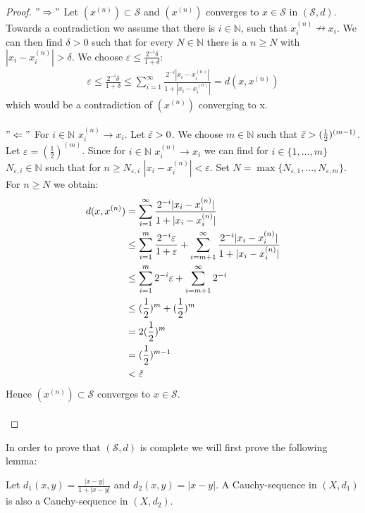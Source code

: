 \documentclass[a4paper]{article}
\newcommand{\N}{\mathbb{N}} %
\begin{document}
\begin{proof}
$"\Rightarrow"$ Let $(x^{(n)}) \subset \mathcal{S}$ and $(x^{(n)})$ converges to $x \in \mathcal{S}$ in $(\mathcal{S},d)$.
Towards a contradiction we assume that there is $i \in \N$, such that $x_i^{(n)} \nrightarrow x_i$. We can then find $\delta > 0$ such that for every $N \in \N$ there is a $n \geq N$ with $|x_i - x_i^{(n)}|> \delta$. We choose $\varepsilon \leq \frac{2^{-i} \delta}{1+ \delta}$:
\begin{align*}
    \varepsilon \leq \frac{2^{-i} \delta}{1+ \delta} \leq \sum_{i = 1}^{\infty} \frac{2^{-i} |x_i -  x_i^{(n)}|}{1+ |x_i -  x_i^{(n)}|} = d(x, x^{(n)})
\end{align*}
which would be a contradiction of $(x^{(n)})$ converging to x.\\\\
$"\Leftarrow"$ For $i \in \N$ $x_i^{(n)} \to x_i$. Let $\Tilde{\varepsilon} > 0 $. We choose $m \in \N$ such that $\Tilde{\varepsilon} > (\frac{1}{2})^{(m-1)}$. Let $\varepsilon = (\frac{1}{2})^{(m)}$. Since for $i \in \N$ $x_i^{(n)} \to x_i$ we can find for $i \in \{1,...,m\}$ $N_{\varepsilon,i} \in \N$ such that for $n \geq N_{\varepsilon,i}$ $|x_i- x_i^{(n)}|  < \varepsilon$. Set $N = \max\{N_{\varepsilon,1},...,N_{\varepsilon,m} \}$. For $n \geq N$ we obtain: 
\begin{align*}
    d(x, x^{(n)}) & = \sum_{i = 1}^{\infty} \frac{2^{-i} |x_i -  x_i^{(n)}|}{1+ |x_i -  x_i^{(n)}|}\\
    & \leq \sum_{i = 1}^{m} \frac{2^{-i} \varepsilon}{ 1+ \varepsilon } + \sum_{i = m+1}^{\infty} \frac{2^{-i} |x_i -  x_i^{(n)}|}{1+ |x_i -  x_i^{(n)}|}\\
    & \leq \sum_{i = 1}^{m} 2^{-i} \varepsilon + \sum_{i = m+1}^{\infty} 2^{-i} \\
    & \leq (\frac{1}{2})^m + (\frac{1}{2})^m \\
    & = 2 (\frac{1}{2})^m \\
    & = (\frac{1}{2})^{m-1} \\
    & < \Tilde{\varepsilon}
\end{align*}
Hence $(x^{(n)}) \subset \mathcal{S}$ converges to $x \in \mathcal{S}$.\\\\
\end{proof}
In order to prove that $(\mathcal{S}, d )$ is complete we will first prove the following lemma:
\begin{lemma}{}{}
    Let $d_1(x,y) = \frac{|x-y|}{1+|x-y|}$ and $d_2(x,y) = |x-y|$. A Cauchy-sequence in $(X, d_1)$ is also a Cauchy-sequence in $(X, d_2)$. 
\end{lemma}
\end{document}
